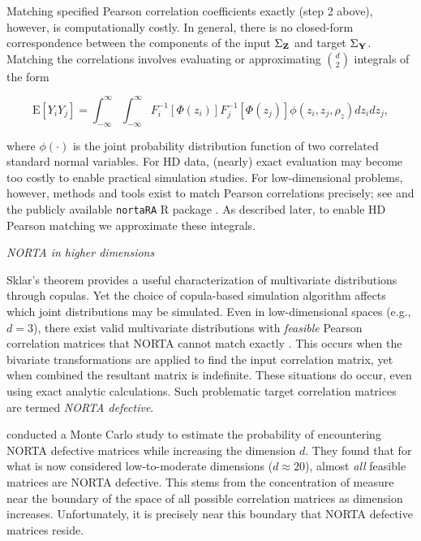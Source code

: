 \documentclass[
]{jss}
\begin{document}
Matching specified Pearson correlation coefficients exactly (step 2
above), however, is computationally costly. In general, there is no
closed-form correspondence between the components of the input
\(\Sigma_{\bf Z}\) and target \(\Sigma_{\bf Y}\). Matching the
correlations involves evaluating or approximating \(\binom{d}{2}\)
integrals of the form

\begin{equation}
    \mathrm{E}\left[Y_i Y_j\right] = \int_{-\infty}^{\infty} \int_{-\infty}^{\infty} F_i^{-1}\left[\Phi(z_i)\right] F_j^{-1}\left[\Phi(z_j)\right] \phi(z_i, z_j, \rho_z) dz_i dz_j,
    \label{eq:pearsonIntegralRelation}
\end{equation}

where \(\phi(\cdot)\) is the joint probability distribution function of
two correlated standard normal variables. For HD data, (nearly) exact
evaluation may become too costly to enable practical simulation studies.
For low-dimensional problems, however, methods and tools exist to match
Pearson correlations precisely; see \citep{Xia17} and the publicly
available \texttt{nortaRA} R package \citep{Chen2001}. As described
later, to enable HD Pearson matching we approximate these integrals.

\emph{NORTA in higher dimensions}

Sklar's theorem provides a useful characterization of multivariate
distributions through copulas. Yet the choice of copula-based simulation
algorithm affects which joint distributions may be simulated. Even in
low-dimensional spaces (e.g., \(d=3\)), there exist valid multivariate
distributions with \emph{feasible} Pearson correlation matrices that
NORTA cannot match exactly \citep{LH75}. This occurs when the bivariate
transformations are applied to find the input correlation matrix, yet
when combined the resultant matrix is indefinite. These situations do
occur, even using exact analytic calculations. Such problematic target
correlation matrices are termed \emph{NORTA defective}.

\citet{GH02} conducted a Monte Carlo study to estimate the probability
of encountering NORTA defective matrices while increasing the dimension
\(d\). They found that for what is now considered low-to-moderate
dimensions (\(d \approx 20\)), almost \emph{all} feasible matrices are
NORTA defective. This stems from the concentration of measure near the
boundary of the space of all possible correlation matrices as dimension
increases. Unfortunately, it is precisely near this boundary that NORTA
defective matrices reside.
\end{document}
